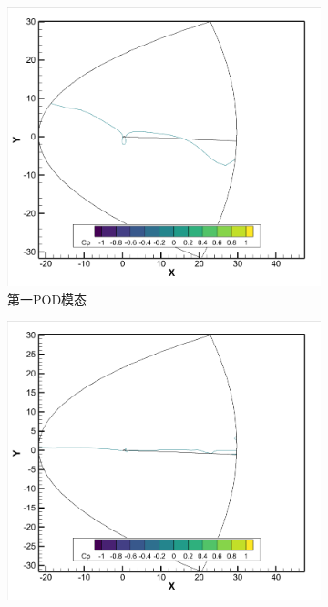 \begin{figure}[H]
    \centering
    \begin{subfigure}[b]{0.32\textwidth}
        \includegraphics[width=\textwidth]{image/基压力分布图/单变量流场压力基1.png}
        \caption{第一POD模态}
    \end{subfigure}
    \begin{subfigure}[b]{0.32\textwidth}
        \includegraphics[width=\textwidth]{image/基压力分布图/单变量流场压力基2.png}

\end{subfigure}
\end{figure}
